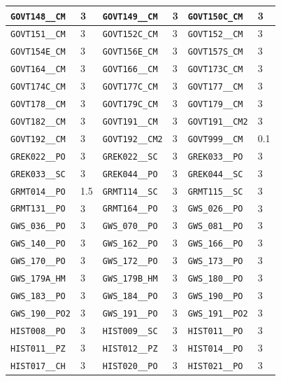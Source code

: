 \begin{longtable}{|l|l||l|l||l|l|}
    \verb|GOVT148__CM| & 3 & \verb|GOVT149__CM| & 3 & \verb|GOVT150C_CM| & 3\\\hline
    \verb|GOVT151__CM| & 3 & \verb|GOVT152C_CM| & 3 & \verb|GOVT152__CM| & 3\\\hline
    \verb|GOVT154E_CM| & 3 & \verb|GOVT156E_CM| & 3 & \verb|GOVT157S_CM| & 3\\\hline
    \verb|GOVT164__CM| & 3 & \verb|GOVT166__CM| & 3 & \verb|GOVT173C_CM| & 3\\\hline
    \verb|GOVT174C_CM| & 3 & \verb|GOVT177C_CM| & 3 & \verb|GOVT177__CM| & 3\\\hline
    \verb|GOVT178__CM| & 3 & \verb|GOVT179C_CM| & 3 & \verb|GOVT179__CM| & 3\\\hline
    \verb|GOVT182__CM| & 3 & \verb|GOVT191__CM| & 3 & \verb|GOVT191__CM2| & 3\\\hline
    \verb|GOVT192__CM| & 3 & \verb|GOVT192__CM2| & 3 & \verb|GOVT999__CM| & 0.1\\\hline
    \verb|GREK022__PO| & 3 & \verb|GREK022__SC| & 3 & \verb|GREK033__PO| & 3\\\hline
    \verb|GREK033__SC| & 3 & \verb|GREK044__PO| & 3 & \verb|GREK044__SC| & 3\\\hline
    \verb|GRMT014__PO| & 1.5 & \verb|GRMT114__SC| & 3 & \verb|GRMT115__SC| & 3\\\hline
    \verb|GRMT131__PO| & 3 & \verb|GRMT164__PO| & 3 & \verb|GWS_026__PO| & 3\\\hline
    \verb|GWS_036__PO| & 3 & \verb|GWS_070__PO| & 3 & \verb|GWS_081__PO| & 3\\\hline
    \verb|GWS_140__PO| & 3 & \verb|GWS_162__PO| & 3 & \verb|GWS_166__PO| & 3\\\hline
    \verb|GWS_170__PO| & 3 & \verb|GWS_172__PO| & 3 & \verb|GWS_173__PO| & 3\\\hline
    \verb|GWS_179A_HM| & 3 & \verb|GWS_179B_HM| & 3 & \verb|GWS_180__PO| & 3\\\hline
    \verb|GWS_183__PO| & 3 & \verb|GWS_184__PO| & 3 & \verb|GWS_190__PO| & 3\\\hline
    \verb|GWS_190__PO2| & 3 & \verb|GWS_191__PO| & 3 & \verb|GWS_191__PO2| & 3\\\hline
    \verb|HIST008__PO| & 3 & \verb|HIST009__SC| & 3 & \verb|HIST011__PO| & 3\\\hline
    \verb|HIST011__PZ| & 3 & \verb|HIST012__PZ| & 3 & \verb|HIST014__PO| & 3\\\hline
    \verb|HIST017__CH| & 3 & \verb|HIST020__PO| & 3 & \verb|HIST021__PO| & 3\\\hline

\end{longtable}
